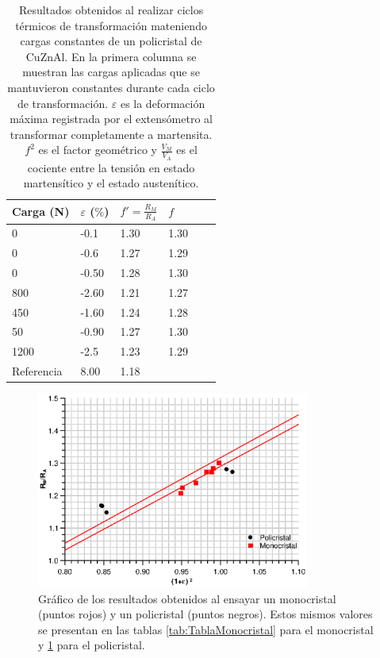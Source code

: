 \documentclass[a4paper,12pt,fleqn,twoside,openany]{book}
\begin{document}
\begin{table} 
\begin{center} 
\begin{tabular}{@{}llllll@{}} \toprule
Carga (N) & $\varepsilon$ ($\%$) &  $f'=\frac{R_M}{R_A}$ &  $f$\\ \midrule
 0        &  -0.1   & 1.30 & 1.30  \\
 0       &  -0.6   & 1.27 &  1.29  \\
 0      &  -0.50   & 1.28 &  1.30  \\
 800      &  -2.60 & 1.21 &  1.27  \\
 450     &  -1.60  & 1.24 &  1.28  \\
 50      &  -0.90  & 1.27 &  1.30  \\
 1200     &  -2.5  & 1.23 &  1.29  \\
 Referencia \cite{resistencia}    & 8.00  & 1.18 &   \\
 \bottomrule
\end{tabular}
\caption{Resultados obtenidos al realizar ciclos térmicos de transformación mateniendo cargas constantes de un policristal de CuZnAl. En la primera columna se muestran las cargas aplicadas que se mantuvieron constantes durante cada ciclo de transformación. $\varepsilon$ es la deformación máxima registrada por el extensómetro al transformar completamente a martensita. $f^2$ es el factor geométrico y $\frac{V_M}{V_A}$ es el cociente entre la tensión en estado martensítico y el estado austenítico.}
\label{tab:TablaPolicristal}
\end{center}
\end{table}


 \begin{figure}[h]
 \centering
 \includegraphics[width=0.8\textwidth]{Img/Resultados/Resistencia/PoliMono2.eps}
 \caption{Gráfico de los resultados obtenidos al ensayar un monocristal (puntos rojos) y un policristal (puntos negros). Estos mismos valores se presentan en las tablas \ref{tab:TablaMonocristal} para el monocristal y \ref{tab:TablaPolicristal} para el policristal.} 
 \label{fig:PoliMono}
 \end{figure}
\end{document}
